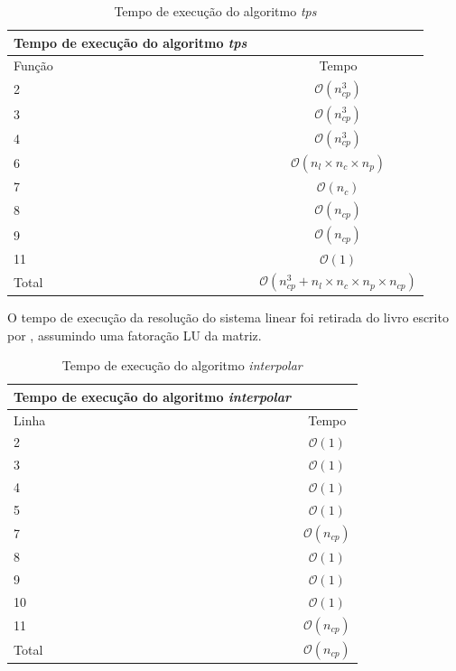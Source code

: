 \begin{table}[H]
\begin{center}
\begin{tabular}{l|c}
\hline
Tempo de execução do algoritmo \textit{tps} \\
\hline
Função & Tempo\\
\hline
2       &$\mathcal{O}(n_{cp}^3)$\\
3       &$\mathcal{O}(n_{cp}^3)$\\
4       &$\mathcal{O}(n_{cp}^3)$\\
6       &$\mathcal{O}(n_l \times n_c \times n_p)$\\
7       &$\mathcal{O}(n_c)$\\
8       &$\mathcal{O}(n_{cp})$\\
9       &$\mathcal{O}(n_{cp})$\\
11      &$\mathcal{O}(1)$\\
\hline
Total   &$\mathcal{O}(n_{cp}^3+n_l \times n_c \times n_p \times n_{cp})$\\
\hline
\end{tabular}
\caption{Tempo de execução do algoritmo \textit{tps}}
\label{table:tps}
\end{center}
\end{table}

  O tempo de execução da resolução do sistema linear foi retirada do livro escrito por
\cite[Part~IV]{trefethen1997numerical}, assumindo uma fatoração LU da matriz.

\begin{table}[H]
\begin{center}
\begin{tabular}{l|c}
\hline
Tempo de execução do algoritmo \textit{interpolar} \\
\hline
Linha&Tempo\\
\hline
2       &$\mathcal{O}(1)$ \\
3       &$\mathcal{O}(1)$ \\
4       &$\mathcal{O}(1)$\\
5       &$\mathcal{O}(1)$\\
7       &$\mathcal{O}(n_{cp})$\\
8       &$\mathcal{O}(1)$\\
9       &$\mathcal{O}(1)$\\
10      &$\mathcal{O}(1)$\\
11      &$\mathcal{O}(n_{cp})$\\
\hline
Total   &$\mathcal{O}(n_{cp})$\\
\hline
\end{tabular}
\caption{Tempo de execução do algoritmo \textit{interpolar}}
\label{table:interpolar}
\end{center}
\end{table}

